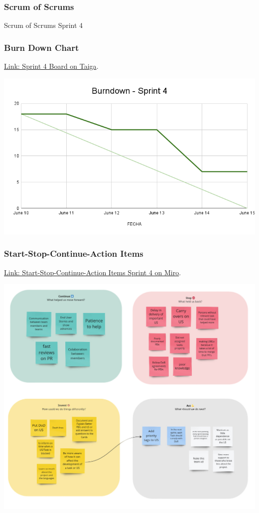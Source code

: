 \hypertarget{sos-s4} {
\subsubsection{Scrum of Scrums}\label{Scrum of Scrums} 
    Scrum of Scrums Sprint 4
}

\hypertarget{burndownchart-s4}{
\subsubsection{Burn Down Chart}\label{Burn Down Chart S4}}
\href{https://tree.taiga.io/project/joseluis-teran-coffeetime/taskboard/sprint-4-6137}{Link: Sprint 4 Board on Taiga}.

\includegraphics[width=\textwidth]{./artifacts/src/sprint-4/assets/Burndown-Sprint4.png}

\hypertarget{startstopcontinueactionitems-s4}{
\subsubsection{Start-Stop-Continue-Action Items}\label{Start-Stop-Continue-Action Items S4}}
\href{https://miro.com/app/board/uXjVKDO7l8M=/?moveToWidget=3458764590247998996&cot=14}{Link: Start-Stop-Continue-Action Items Sprint 4 on Miro}.

\includegraphics[width=\textwidth]{./artifacts/src/sprint-4/assets/Retrospectives-Sprint4.png}